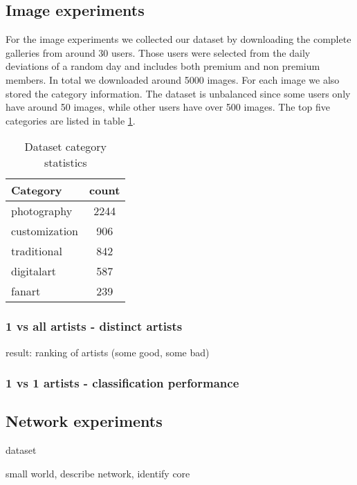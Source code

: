 \subsection{Image experiments}
For the image experiments we collected our dataset by downloading the complete galleries from around 30 users.
Those users were selected from the daily deviations of a random day and includes both premium and non premium members.
In total we downloaded around 5000 images. 
For each image we also stored the category information.
The dataset is unbalanced since some users only have around 50 images, while other users have over 500 images.
The top five categories are listed in table \ref{datasetstats}.

\begin{table}
    \centering
    \begin{tabular}
        { | l | c | } 
        \hline
        Category & count \\
        \hline
        photography & 2244 \\ 
        customization & 906 \\ 
        traditional & 842 \\ 
        digitalart & 587 \\ 
        fanart & 239 \\ 
        \hline 
    \end{tabular}
    \caption{Dataset category statistics}
    \label{datasetstats}
\end{table}

\subsubsection{1 vs all artists - distinct artists}
result: ranking of artists (some good, some bad)

\subsubsection{1 vs 1 artists - classification performance}

\subsection{Network experiments}
dataset

small world, describe network, identify core